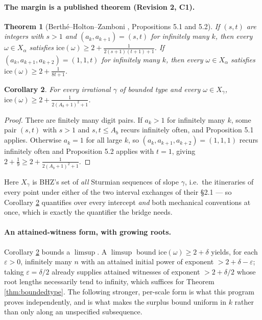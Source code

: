 \documentclass[11pt]{article}
\newtheorem{theorem}{Theorem}[section]
\newtheorem{corollary}[theorem]{Corollary}
\begin{document}
\paragraph{The margin is a published theorem (Revision 2, C1).}

\begin{theorem}[Berth\'e--Holton--Zamboni \cite{BHZ2006}, Propositions 5.1 and 5.2]
\label{thm:bhzmargin}
If $(s,t)$ are integers with $s>1$ and $(a_k,a_{k+1})=(s,t)$ for infinitely many $k$, then every
$\omega\in X_\alpha$ satisfies $\text{ice}(\omega)\ge2+\frac1{2(s+1)(t+1)+1}$. If
$(a_k,a_{k+1},a_{k+2})=(1,1,t)$ for infinitely many $k$, then every $\omega\in X_\alpha$ satisfies
$\text{ice}(\omega)\ge2+\frac1{8t+1}$.
\end{theorem}

\begin{corollary}
\label{cor:bhzbounded}
For every irrational $\gamma$ of bounded type and every $\omega\in X_\gamma$,
$\text{ice}(\omega)\ge2+\frac1{2(A_b+1)^2+1}$.
\end{corollary}

\begin{proof}
There are finitely many digit pairs. If $a_k>1$ for infinitely many $k$, some pair $(s,t)$ with
$s>1$ and $s,t\le A_b$ recurs infinitely often, and Proposition 5.1 applies. Otherwise $a_k=1$ for
all large $k$, so $(a_k,a_{k+1},a_{k+2})=(1,1,1)$ recurs infinitely often and Proposition 5.2
applies with $t=1$, giving $2+\frac19\ge2+\frac1{2(A_b+1)^2+1}$.
\end{proof}

Here $X_\gamma$ is BHZ's set of \emph{all} Sturmian sequences of slope $\gamma$, i.e.\ the
itineraries of every point under either of the two interval exchanges of their \S2.1 --- so
Corollary \ref{cor:bhzbounded} quantifies over every intercept \emph{and} both mechanical
conventions at once, which is exactly the quantifier the bridge needs.

\paragraph{An attained-witness form, with growing roots.} Corollary \ref{cor:bhzbounded} bounds a
$\limsup$. A $\limsup$ bound $\text{ice}(\omega)\ge2+\delta$ yields, for each $\varepsilon>0$,
infinitely many $n$ with an attained initial power of exponent $>2+\delta-\varepsilon$; taking
$\varepsilon=\delta/2$ already supplies attained witnesses of exponent $>2+\delta/2$ whose root
lengths necessarily tend to infinity, which suffices for Theorem \ref{thm:boundedtype}. The
following stronger, per-scale form is what this program proves independently, and is what makes the
surplus bound uniform in $k$ rather than only along an unspecified subsequence.
\end{document}
